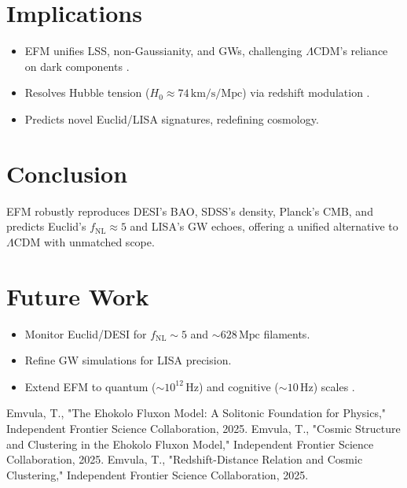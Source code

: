\documentclass{article}
\begin{document}
\section{Implications}
\begin{itemize}
    \item EFM unifies LSS, non-Gaussianity, and GWs, challenging \(\Lambda\)CDM’s reliance on dark components \cite{emvula2025clustering}.
    \item Resolves Hubble tension (\( H_0 \approx 74 \, \text{km/s/Mpc}\)) via redshift modulation \cite{emvula2025redshift}.
    \item Predicts novel Euclid/LISA signatures, redefining cosmology.
\end{itemize}

\section{Conclusion}
EFM robustly reproduces DESI’s BAO, SDSS’s density, Planck’s CMB, and predicts Euclid’s \( f_{\text{NL}} \approx 5 \) and LISA’s GW echoes, offering a unified alternative to \(\Lambda\)CDM with unmatched scope.

\section{Future Work}
\begin{itemize}
    \item Monitor Euclid/DESI for \( f_{\text{NL}} \sim 5 \) and \(\sim 628 \, \text{Mpc}\) filaments.
    \item Refine GW simulations for LISA precision.
    \item Extend EFM to quantum (\(\sim 10^{12} \, \text{Hz}\)) and cognitive (\(\sim 10 \, \text{Hz}\)) scales \cite{emvula2025memory}.
\end{itemize}



\begin{thebibliography}{3}
 Emvula, T., "The Ehokolo Fluxon Model: A Solitonic Foundation for Physics," Independent Frontier Science Collaboration, 2025.
 Emvula, T., "Cosmic Structure and Clustering in the Ehokolo Fluxon Model," Independent Frontier Science Collaboration, 2025.
 Emvula, T., "Redshift-Distance Relation and Cosmic Clustering," Independent Frontier Science Collaboration, 2025.
\end{thebibliography}
\end{document}
